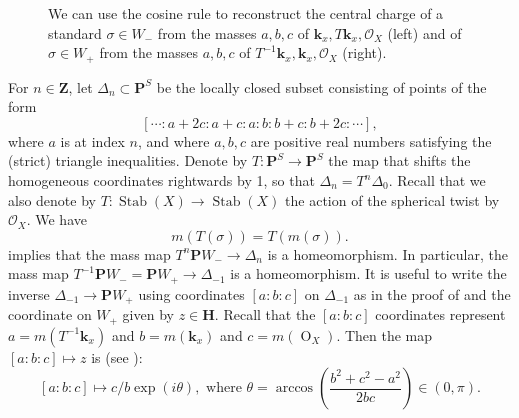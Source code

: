 \documentclass{amsart}
\begin{document}
\begin{figure}[ht]
  \centering
  \caption{We can use the cosine rule to reconstruct the central charge of a standard \(\sigma \in W_-\) from the masses \(a,b,c\) of \(\mathbf{k}_x, T\mathbf{k}_x, \mathcal{O}_X \) (left) and of \(\sigma \in W_+\) from the masses \(a,b,c\) of \(T^{-1} \mathbf{k}_x, \mathbf{k}_x, \mathcal{O}_X\) (right).}
  \label{fig:cosrule}
\end{figure}

For \(n \in \mathbf{Z}\), let \(\Delta_n \subset \mathbf{P}^S\) be the locally closed subset consisting of points of the form
\[ [\cdots :a+2c:a+c:a:b:b+c:b+2c: \cdots],\]
where \(a\) is at index \(n\), and where \(a,b,c\) are positive real numbers satisfying the (strict) triangle inequalities.
Denote by \(T \colon \mathbf{P}^S \to \mathbf{P}^S\) the map that shifts the homogeneous coordinates rightwards by 1, so that \(\Delta_n = T^n \Delta_0\).
Recall that we also denote by \(T \colon \operatorname{Stab}(X) \to \operatorname{Stab}(X)\) the action of the spherical twist by \(\mathcal{O}_X\).
We have
\[ m (T (\sigma)) = T (m(\sigma)).\]
 implies that the mass map \(T^n \mathbf{P}W_- \to \Delta_n\) is a homeomorphism.
In particular, the mass map \(T^{-1} \mathbf{P}W_- = \mathbf{P}W_+ \to \Delta_{-1}\) is a homeomorphism.
It is useful to write the inverse \(\Delta_{-1} \to \mathbf{P}W_+\) using coordinates \([a:b:c]\) on \(\Delta_{-1}\) as in the proof of  and the coordinate on \(W_+\) given by \(z \in \mathbf{H}\).
Recall that the \([a:b:c]\) coordinates represent \(a = m(T^{-1} \mathbf{k}_x)\) and \(b = m(\mathbf{k}_x)\) and \(c = m(\operatorname{O}_X)\).
Then the map \([a:b:c] \mapsto z\) is (see ):
\begin{equation}\label{eqn:inv+}
  [a:b:c] \mapsto c/b \exp(i \theta), \text{ where } \theta = \arccos \left( \frac{b^2+c^2-a^2}{2bc} \right) \in (0,\pi).
\end{equation}
\end{document}
